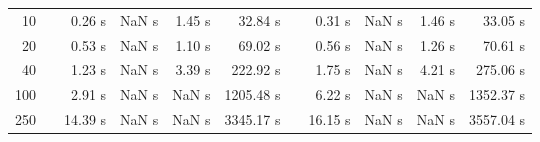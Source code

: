 {\begin{table}[h]
\begin{tabular}{rr rrrr r rrrr}
10 & & 0.26 s &  NaN s & 1.45 s & 32.84 s && 0.31 s &  NaN s & 1.46 s & 33.05 s \\ 
20 & & 0.53 s &  NaN s & 1.10 s & 69.02 s && 0.56 s &  NaN s & 1.26 s & 70.61 s \\ 
40 & & 1.23 s &  NaN s & 3.39 s & 222.92 s && 1.75 s &  NaN s & 4.21 s & 275.06 s \\ 
100 & & 2.91 s &  NaN s &  NaN s & 1205.48 s && 6.22 s &  NaN s &  NaN s & 1352.37 s \\ 
250 & & 14.39 s &  NaN s &  NaN s & 3345.17 s && 16.15 s &  NaN s &  NaN s & 3557.04 s \\ 
\hline 
\end{tabular} 
\end{table} 
} 
